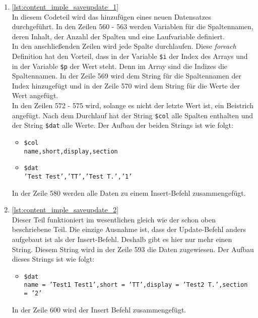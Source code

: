 \begin{enumerate}

	\item \autoref{lst:content_imple_saveupdate_1}\\
	In diesem Codeteil wird das hinzufügen eines neuen Datensatzes durchgeführt. In den Zeilen 560 - 563 werden Variablen für die Spaltennamen, deren Inhalt, der Anzahl der Spalten und eine Laufvariable definiert.\\
	In den anschließenden Zeilen wird jede Spalte durchlaufen. Diese \textit{foreach} Definition hat den Vorteil, dass in der Variable \texttt{\$i} der Index des Arrays und in der Variable \texttt{\$p} der Wert steht. Denn im Array sind die Indizes die Spaltennamen. In der Zeile 569 wird dem String für die Spaltennamen der Index hinzugefügt und in der Zeile 570 wird dem String für die Werte der Wert angefügt.\\
	In den Zeilen 572 - 575 wird, solange es nicht der letzte Wert ist, ein Beistrich angefügt. Nach dem Durchlauf hat der String \texttt{\$col} alle Spalten enthalten und der String \texttt{\$dat} alle Werte. Der Aufbau der beiden Strings ist wie folgt:
	
	\begin{itemize}
		\item \texttt{\$col}\\
		\texttt{name,short,display,section}
		\item  \texttt{\$dat}\\
		\texttt{'Test Test','TT','Test T.','1'}
	\end{itemize}
	
	In der Zeile 580 werden alle Daten zu einem Insert-Befehl zusammengefügt.
	
	

	\item \autoref{lst:content_imple_saveupdate_2}\\
	Dieser Teil funktioniert im wesentlichen gleich wie der schon oben beschriebene Teil. Die einzige Ausnahme ist, dass der Update-Befehl anders aufgebaut ist als der Insert-Befehl. Deshalb gibt es hier nur mehr einen String. Diesem String wird in der Zeile 593 die Daten zugewiesen. Der Aufbau dieses Strings ist wie folgt:
	
	\begin{itemize}
		\item  \texttt{\$dat}\\
		\texttt{name = 'Test1 Test1',short = 'TT',display = 'Test2 T.',section = '2'}
	\end{itemize}
	
	In der Zeile 600 wird der Insert Befehl zusammengefügt.
	
	

\end{enumerate}

